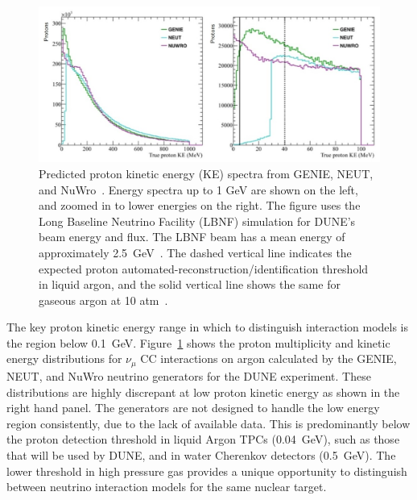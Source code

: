 \begin{figure}%
    \centering
    \includegraphics[width=12cm]{files/Figures/protons_from_argon.jpeg}%
    \caption{Predicted proton kinetic energy (KE) spectra from GENIE, NEUT, and NuWro~\cite{Raaf:2018aaa}. Energy spectra up to 1 GeV are shown on the left, and zoomed in to lower energies on the right. The figure uses the Long Baseline Neutrino Facility (LBNF)  simulation for DUNE's beam energy and flux. The LBNF beam has a mean energy of approximately 2.5~GeV~\cite{abi2020deep}. The dashed vertical line indicates the expected proton automated-reconstruction/identification threshold in liquid argon, and the solid vertical line shows the same for gaseous argon at 10 atm~\cite{dune2018high}.}
    \label{fig:protonsfromargon}%
\end{figure}

The key proton kinetic energy range in which to distinguish interaction models is the region below 0.1~GeV.
Figure~\ref{fig:protonsfromargon} shows the proton multiplicity and kinetic energy distributions for $\nu_{\mu}$ CC interactions on argon calculated by the GENIE, NEUT, and NuWro neutrino generators for the DUNE experiment.
These distributions are highly discrepant at low proton kinetic energy as shown in the right hand panel. The generators are not designed to handle the low energy region consistently, due to the lack of available data.
This is predominantly below the proton detection threshold in liquid Argon TPCs (0.04~GeV), such as those that will be used by DUNE, and in water Cherenkov detectors (0.5~GeV).
The lower threshold in high pressure gas provides a unique opportunity to distinguish between neutrino interaction models for the same nuclear target.

